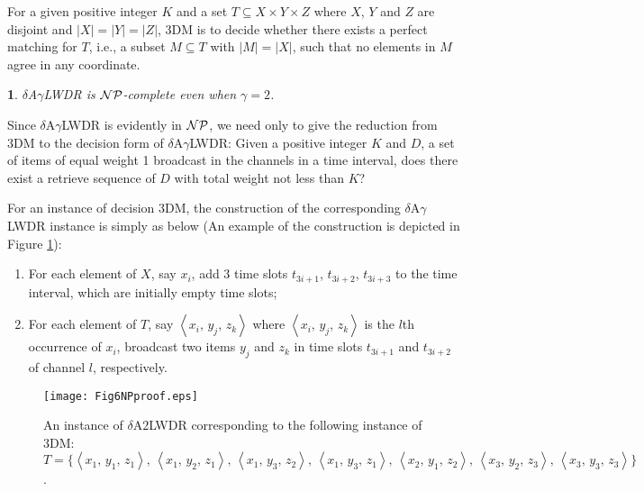 \documentclass[11pt,english,onecolumn,draftcls]{IEEEtran}
\theoremstyle{plain}
\newtheorem{thm}{\protect\theoremname}
\theoremstyle{plain}
\theoremstyle{plain}
\theoremstyle{plain}
\providecommand{\theoremname}{Theorem}
\begin{document}
For a given positive integer $K$ and a set $T\subseteq X\times Y\times Z$
where $X$, $Y$ and $Z$ are disjoint and $|X|=|Y|=|Z|$, 3DM is
to decide whether there exists a perfect matching for $T$, i.e.,
a subset $M\subseteq T$ with $|M|=|X|$, such that no elements in
$M$ agree in any coordinate.
\begin{thm}
\label{thm:kagammaLWDR-is-NP-complete,} $\delta$A$\gamma$LWDR is
${\cal NP}$-complete even when $\gamma=2$.
\end{thm}
Since $\delta$A$\gamma$LWDR is evidently in ${\cal NP}$, we need
only to give the reduction from 3DM to the decision form of $\delta$A$\gamma$LWDR:
Given a positive integer $K$ and $D$, a set of items of equal weight
1 broadcast in the channels in a time interval, does there exist a
retrieve sequence of $D$ with total weight not less than $K$?

For an instance of decision 3DM, the construction of the corresponding
$\delta$A$\gamma$LWDR instance is simply as below (An example of
the construction is depicted in Figure \ref{fig:nproof}):
\begin{enumerate}
\item For each element of $X$, say $x_{i}$, add 3 time slots $t_{3i+1}$,
$t_{3i+2}$, $t_{3i+3}$ to the time interval, which are initially
empty time slots;
\item For each element of $T$, say $\left\langle x_{i},\, y_{j},\, z_{k}\right\rangle $
where $\left\langle x_{i},\, y_{j},\, z_{k}\right\rangle $ is the
$l$th occurrence of $x_{i}$, broadcast two items $y_{j}$ and $z_{k}$ in
time slots $t_{3i+1}$ and $t_{3i+2}$ of channel $l$, respectively.
\end{enumerate}
\begin{figure}
\texttt{[image: Fig6NPproof.eps]}

\protect\caption{\label{fig:nproof}An instance of $\delta$A$2$LWDR corresponding
to the following instance of 3DM: $T=\{\left\langle x_{1},\, y_{1},\, z_{1}\right\rangle ,\,\left\langle x_{1},\, y_{2},\, z_{1}\right\rangle ,\,\left\langle x_{1},\, y_{3},\, z_{2}\right\rangle ,\,\left\langle x_{1},\, y_{3},\, z_{1}\right\rangle ,\,\left\langle x_{2},\, y_{1},\, z_{2}\right\rangle ,\,\left\langle x_{3},\, y_{2},\, z_{3}\right\rangle ,\,\left\langle x_{3},\, y_{3},\, z_{3}\right\rangle \}$.}
\end{figure}
\end{document}
